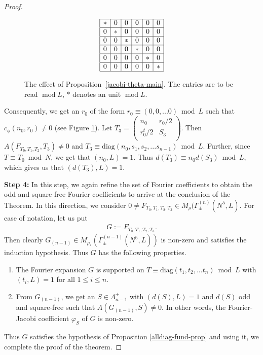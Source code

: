 \documentclass[11pt]{amsart}
\numberwithin{equation}{section}
\newcommand{\mrm}{\mathrm} %
\newcommand{\smat}[4]{\left( \begin{smallmatrix} #1 & #2 \\ #3 & #4 \\ \end{smallmatrix} \right)}
\renewcommand*{\mod}{\operatorname{mod}}
\newcommand{\Mrho}[2]{M_\rho(\Gamma_\pm^{(#1)}(#2, L)}
\begin{document}
\begin{proof}
\begin{figure}[!htbp]
\begin{align}
\begin{array}{@{}c@{}}
\begin{array}{|c|c|c|c|c|c|}
    \cline{1-6}
    * & 0 & 0 & 0 & 0 & 0 \\ \hline
    0 & * & 0 & 0 & 0 & 0 \\ \hline
    0 & 0 & * & 0 & 0 & 0 \\ \hline
    0 & 0 & 0 & * & 0 & 0 \\ \hline
    0 & 0 & 0 & 0 & * & 0 \\ \hline
    0 & 0 & 0 & 0 & 0 & * \\ \hline
    \end{array}
\end{array}
\end{align}
\caption{The effect of Proposition~\ref{jacobi-theta-main}. The entries are to be read $\mod L$, $*$ denotes an unit $\mod L$.} \label{2cell-fig}
\end{figure}

Consequently, we get an $r_0$ of the form $r_0\equiv (0,0,...0)\bmod L$ such that $c_{\phi}(n_0, r_0)\neq 0$ (see Figure \ref{2cell-fig}). Let $T_3=\smat{n_0}{r_0/2}{r_0^t/2}{S_3}$. Then $A\left(F_{T_0,T_1,T_2}, T_3\right)\neq 0$ and $T_3\equiv \mrm{diag}(n_0, s_1, s_2,...s_{n-1})\bmod L $. Further, since $T\equiv T_0\bmod N$, we get that $(n_0, L)=1$. Thus $d(T_3) \equiv  n_0d(S_3)\bmod L$, which gives us that $(d(T_3), L)=1$. 

\textbf{Step 4:} In this step, we again refine the set of Fourier coefficients to obtain the odd and square-free Fourier coefficients to arrive at the conclusion of the Theorem. In this direction, we consider $0\neq F_{T_0,T_1,T_2,T_3}\in \Mrho{n}{N^5}$.  For ease of notation, let us put
\begin{align}
 G:= F_{T_0,T_1, T_2, T_3}.   
\end{align} 
Then clearly $G_{(n-1)}\in M_{\rho_*}(\Gamma_\pm^{(n-1)}(N^5, L))$ is non-zero and satisfies the induction hypothesis. Thus $G$ has the following properties.
\begin{enumerate}
    \item  The Fourier expansion $G$ is supported on $T\equiv \mrm{diag}(t_1, t_2,...t_n)\bmod L$ with $(t_i, L)=1$ for all $1\le i\le n$.
    \item From $G_{(n-1)}$, we get an $S\in \Lambda_{n-1}^+$ with $(d(S), L)=1$ and $d(S)$ odd and square-free such that $A(G_{(n-1)}, S)\neq 0$. In other words, the Fourier-Jacobi coefficient $\varphi_S$ of $G$ is non-zero.
\end{enumerate}
Thus $G$ satisfies the hypothesis of Proposition \ref{alldiag-fund-prop} and using it, we complete the proof of the theorem.
\end{proof}
\end{document}
